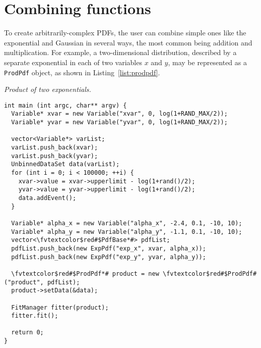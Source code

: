 \section{Combining functions}
\label{sec:combining}

To create arbitrarily-complex PDFs, the user can combine 
simple ones like the exponential and Gaussian in several
ways, the most common being addition and multiplication.
For example, a two-dimensional distribution, described by
a separate exponential in each of two variables $x$ and $y$, may be represented
as a \texttt{ProdPdf} object, as shown in Listing~\ref{list:prodpdf}.

\begin{listing}
\label{list:prodpdf} \emph{Product of two exponentials.}

\begin{Verbatim}[commandchars=\\\$\#]
int main (int argc, char** argv) {
  Variable* xvar = new Variable("xvar", 0, log(1+RAND_MAX/2)); 
  Variable* yvar = new Variable("yvar", 0, log(1+RAND_MAX/2)); 
  
  vector<Variable*> varList;
  varList.push_back(xvar);
  varList.push_back(yvar);
  UnbinnedDataSet data(varList);
  for (int i = 0; i < 100000; ++i) {
    xvar->value = xvar->upperlimit - log(1+rand()/2);
    yvar->value = yvar->upperlimit - log(1+rand()/2);
    data.addEvent(); 
  }
  
  Variable* alpha_x = new Variable("alpha_x", -2.4, 0.1, -10, 10);
  Variable* alpha_y = new Variable("alpha_y", -1.1, 0.1, -10, 10);
  vector<\fvtextcolor$red#$PdfBase*#> pdfList;
  pdfList.push_back(new ExpPdf("exp_x", xvar, alpha_x)); 
  pdfList.push_back(new ExpPdf("exp_y", yvar, alpha_y)); 

  \fvtextcolor$red#$ProdPdf*# product = new \fvtextcolor$red#$ProdPdf#("product", pdfList);
  product->setData(&data);

  FitManager fitter(product);
  fitter.fit();

  return 0;
}
\end{Verbatim}
\end{listing}

